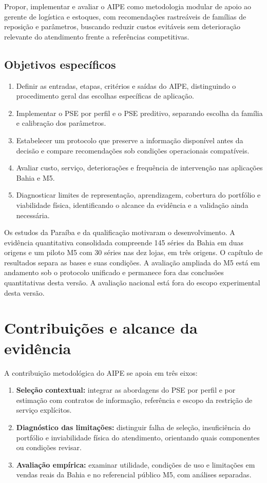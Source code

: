 Propor, implementar e avaliar o AIPE como metodologia modular de apoio ao gerente de logística e estoques, com recomendações rastreáveis de famílias de reposição e parâmetros, buscando reduzir custos evitáveis sem deterioração relevante do atendimento frente a referências competitivas.

\subsection*{Objetivos específicos}

\begin{enumerate}
  \item Definir as entradas, etapas, critérios e saídas do AIPE, distinguindo o procedimento geral das escolhas específicas de aplicação.
  \item Implementar o PSE por perfil e o PSE preditivo, separando escolha da família e calibração dos parâmetros.
  \item Estabelecer um protocolo que preserve a informação disponível antes da decisão e compare recomendações sob condições operacionais compatíveis.
  \item Avaliar custo, serviço, deteriorações e frequência de intervenção nas aplicações Bahia e M5.
  \item Diagnosticar limites de representação, aprendizagem, cobertura do portfólio e viabilidade física, identificando o alcance da evidência e a validação ainda necessária.
\end{enumerate}

Os estudos da Paraíba e da qualificação motivaram o desenvolvimento. A evidência quantitativa consolidada compreende 145 séries da Bahia em duas origens e um piloto M5 com 30 séries nas dez lojas, em três origens. O capítulo de resultados separa as bases e suas condições. A avaliação ampliada do M5 está em andamento sob o protocolo unificado e permanece fora das conclusões quantitativas desta versão. A avaliação nacional está fora do escopo experimental desta versão.

\section{Contribuições e alcance da evidência}

A contribuição metodológica do AIPE se apoia em três eixos:
\begin{enumerate}
  \item \textbf{Seleção contextual:} integrar as abordagens do PSE por perfil e por estimação com contratos de informação, referência e escopo da restrição de serviço explícitos.
  \item \textbf{Diagnóstico das limitações:} distinguir falha de seleção, insuficiência do portfólio e inviabilidade física do atendimento, orientando quais componentes ou condições revisar.
  \item \textbf{Avaliação empírica:} examinar utilidade, condições de uso e limitações em vendas reais da Bahia e no referencial público M5, com análises separadas.
\end{enumerate}


